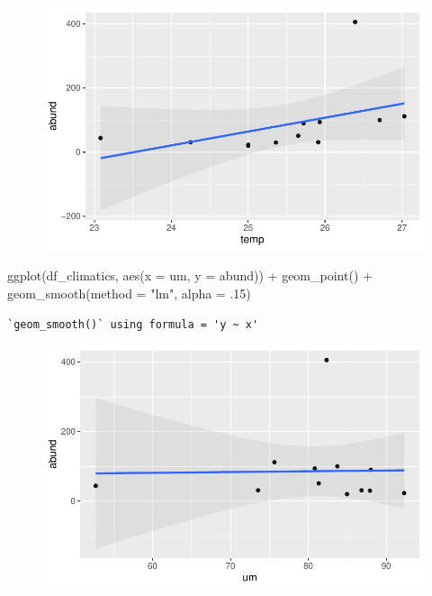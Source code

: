 \documentclass[
  letterpaper,
  DIV=11,
  numbers=noendperiod]{scrartcl}
\newenvironment{Shaded}{\begin{snugshade}}{\end{snugshade}}
\newcommand{\AttributeTok}[1]{\textcolor[rgb]{0.40,0.45,0.13}{#1}}
\newcommand{\DecValTok}[1]{\textcolor[rgb]{0.68,0.00,0.00}{#1}}
\newcommand{\FunctionTok}[1]{\textcolor[rgb]{0.28,0.35,0.67}{#1}}
\newcommand{\NormalTok}[1]{\textcolor[rgb]{0.00,0.23,0.31}{#1}}
\newcommand{\SpecialCharTok}[1]{\textcolor[rgb]{0.37,0.37,0.37}{#1}}
\newcommand{\StringTok}[1]{\textcolor[rgb]{0.13,0.47,0.30}{#1}}
\begin{document}
\begin{figure}[H]

{\centering \includegraphics{report_nmds_files/figure-pdf/unnamed-chunk-7-1.pdf}

}

\end{figure}

\begin{Shaded}
\begin{Highlighting}[]
\FunctionTok{ggplot}\NormalTok{(df\_climatics, }\FunctionTok{aes}\NormalTok{(}\AttributeTok{x =}\NormalTok{ um, }\AttributeTok{y =}\NormalTok{ abund)) }\SpecialCharTok{+}
  \FunctionTok{geom\_point}\NormalTok{() }\SpecialCharTok{+}
  \FunctionTok{geom\_smooth}\NormalTok{(}\AttributeTok{method =} \StringTok{"lm"}\NormalTok{, }\AttributeTok{alpha =}\NormalTok{ .}\DecValTok{15}\NormalTok{)}
\end{Highlighting}
\end{Shaded}

\begin{verbatim}
`geom_smooth()` using formula = 'y ~ x'
\end{verbatim}

\begin{figure}[H]

{\centering \includegraphics{report_nmds_files/figure-pdf/unnamed-chunk-8-1.pdf}

}

\end{figure}
\end{document}
